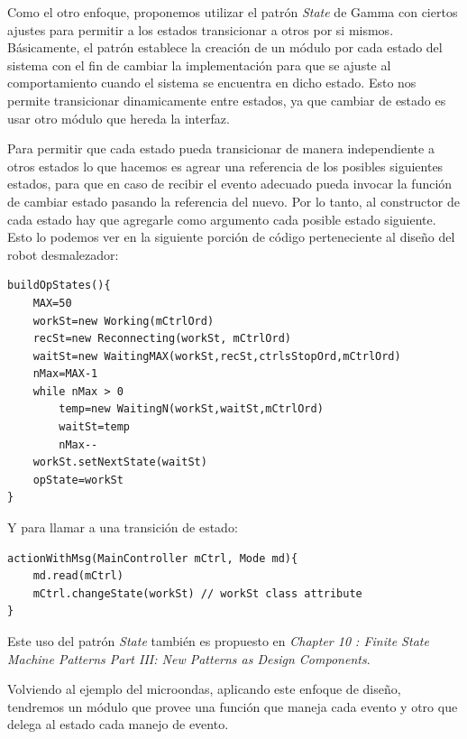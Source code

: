 Como el otro enfoque, proponemos utilizar el patrón \textit{State} de Gamma con ciertos ajustes para permitir a los estados transicionar a otros por si mismos. Básicamente, el patrón establece la creación de un módulo por cada estado del sistema con el fin de cambiar la implementación para que se ajuste al comportamiento cuando el sistema se encuentra en dicho estado. Esto nos permite transicionar dinamicamente entre estados, ya que cambiar de estado es usar otro módulo que hereda la interfaz.

Para permitir que cada estado pueda transicionar de manera independiente a otros estados lo que hacemos es agrear una referencia de los posibles siguientes estados, para que en caso de recibir el evento adecuado pueda invocar la función de cambiar estado pasando la referencia del nuevo. Por lo tanto, al constructor de cada estado hay que agregarle como argumento cada posible estado siguiente. Esto lo podemos ver en la siguiente porción de código perteneciente al diseño del robot desmalezador:

\begin{lstlisting}
buildOpStates(){
    MAX=50
    workSt=new Working(mCtrlOrd)
    recSt=new Reconnecting(workSt, mCtrlOrd)
    waitSt=new WaitingMAX(workSt,recSt,ctrlsStopOrd,mCtrlOrd)
    nMax=MAX-1
    while nMax > 0
        temp=new WaitingN(workSt,waitSt,mCtrlOrd)
        waitSt=temp
        nMax--
    workSt.setNextState(waitSt)
    opState=workSt
}
\end{lstlisting}

Y para llamar a una transición de estado:
\begin{lstlisting}
actionWithMsg(MainController mCtrl, Mode md){
    md.read(mCtrl)
    mCtrl.changeState(workSt) // workSt class attribute
}
\end{lstlisting}

Este uso del patrón \textit{State} también es propuesto en \textit{Chapter 10 : Finite State Machine Patterns Part III: New Patterns as Design Components}.


Volviendo al ejemplo del microondas, aplicando este enfoque de diseño, tendremos un módulo que provee una función que maneja cada evento y otro que delega al estado cada manejo de evento.

